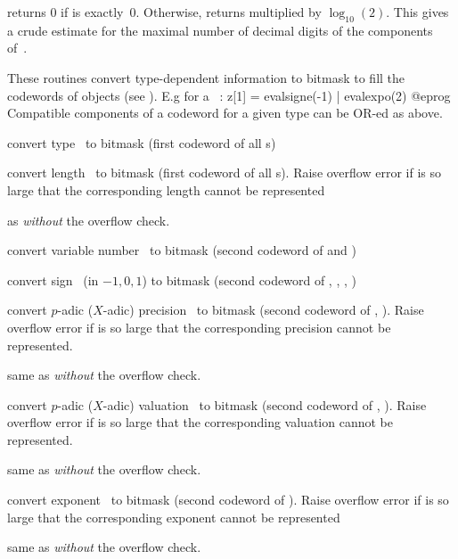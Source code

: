  returns 0 if  is exactly~0. Otherwise,
returns  multiplied by $\log_{10}(2)$. This gives a crude
estimate for the maximal number of decimal digits of the components
of~.

These routines convert type-dependent information to bitmask to fill the
codewords of  objects (see ). E.g for a
~:
\bprog
  z[1] = evalsigne(-1) | evalexpo(2)
@eprog
Compatible components of a codeword for a given type can be OR-ed as above.

 convert type~ to bitmask (first
codeword of all s)

 convert length~ to bitmask (first
codeword of all s). Raise overflow error if  is so large that
the corresponding length cannot be represented

 as  \emph{without} the overflow
check.

 convert variable number~ to bitmask
(second codeword of  and )

 convert sign~ (in $-1,0,1$) to bitmask
(second codeword of , , , )

 convert $p$-adic ($X$-adic) precision~
to bitmask (second codeword of , ). Raise overflow error
if  is so large that the corresponding precision cannot be
represented.

 same as  \emph{without} the
overflow check.

 convert $p$-adic ($X$-adic) valuation~ to
bitmask (second codeword of , ). Raise overflow error if
 is so large that the corresponding valuation cannot be represented.

 same as  \emph{without} the
overflow check.

 convert exponent~ to bitmask (second
codeword of ). Raise overflow error if  is so
large that the corresponding exponent cannot be represented

 same as  \emph{without} the
overflow check.

